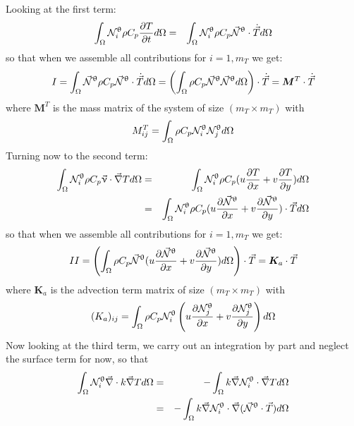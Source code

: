 Looking at the first term:
\begin{eqnarray}
\int_\Omega {\mathcal{N}}^\uptheta_i  \rho C_p \frac{\partial T}{\partial t} d\Omega
&=&  \int_\Omega {\mathcal{N}}^\uptheta_i  \rho C_p \vec {{\mathcal{N}}}^\uptheta \cdot \dot{\vec T}  d\Omega \\
\end{eqnarray}
so that when we assemble all contributions for $i=1,m_T$ we get:
\begin{equation}
I 
= \int_\Omega \vec {{\mathcal{N}}}^\uptheta  \rho C_p \vec {{\mathcal{N}}}^\uptheta \cdot \dot{\vec T}  d\Omega
= \left( \int_\Omega \rho C_p  \vec {{\mathcal{N}}}^\uptheta  \vec {{\mathcal{N}}}^\uptheta  d\Omega \right) \cdot \dot{\vec T}
= {\bm M}^T \cdot \dot{\vec T}
 \end{equation}
where ${\bm M}^T$ is the mass matrix of the system of size $(m_T \times m_T)$ with 
\begin{equation}
M_{ij}^T = \int_\Omega \rho C_p {\mathcal{N}}_i^\uptheta {\mathcal{N}}_j^\uptheta d\Omega
\end{equation}
Turning now to the second term:
\begin{eqnarray}
\int_\Omega {\mathcal{N}}^\uptheta_i  \rho C_p  {\vec \upnu}\cdot {\vec\nabla T}   d\Omega
&=& \int_\Omega {\mathcal{N}}^\uptheta_i  \rho C_p (u \frac{\partial T}{\partial x} +  v \frac{\partial T}{\partial y} ) d\Omega \\
&=& \int_\Omega {\mathcal{N}}^\uptheta_i  \rho C_p (u \frac{\partial \vec {{\mathcal{N}}}^\uptheta}{\partial x} +  v \frac{\partial \vec {{\mathcal{N}}}^\uptheta}{\partial y} ) \cdot \vec T d\Omega \\
\end{eqnarray}
so that when we assemble all contributions for $i=1,m_T$ we get:
\[
II = \left(\int_\Omega \rho C_p \vec {{\mathcal{N}}}^\uptheta (u \frac{\partial \vec {{\mathcal{N}}}^\uptheta}{\partial x} +  
v \frac{\partial \vec {{\mathcal{N}}}^\uptheta}{\partial y} ) d\Omega \right)  \cdot \vec T = {\bm K}_a \cdot \vec T
\]
where ${\bm K}_a$ is the advection term matrix of size $(m_T \times m_T)$ with
\[
(K_a)_{ij} = \int_\Omega \rho C_p {\mathcal{N}}_i^\uptheta 
\left(u \frac{\partial {\mathcal{N}}_j^\uptheta}{\partial x} +  v \frac{\partial {\mathcal{N}}_j^\uptheta}{\partial y} \right) d\Omega 
\]
Now looking at the third term, we carry out an integration by part and neglect the surface term for now, so that 
\begin{eqnarray}
\int_\Omega  {\mathcal{N}}^\uptheta_i {\vec \nabla} \cdot k \vec\nabla T d\Omega
&=& - \int_\Omega  k \vec \nabla {\mathcal{N}}^\uptheta_i \cdot \vec\nabla T d\Omega \\
&=& - \int_\Omega  k \vec \nabla {\mathcal{N}}^\uptheta_i \cdot \vec\nabla (\vec {{\mathcal{N}}}^\uptheta \cdot \vec T) d\Omega \\
\end{eqnarray}
